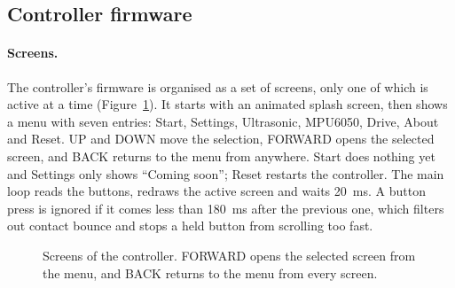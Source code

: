\subsection{Controller firmware}
\label{sec:con-fw}

\paragraph{Screens.} The controller's firmware is organised as a set of screens, only one
of which is active at a time (Figure~\ref{fig:screens}). It starts with an animated splash
screen, then shows a menu with seven entries: Start, Settings, Ultrasonic, MPU6050, Drive,
About and Reset. UP and DOWN move the selection, FORWARD opens the selected screen, and
BACK returns to the menu from anywhere. Start does nothing yet and Settings only shows
``Coming soon''; Reset restarts the controller. The main loop reads the buttons, redraws
the active screen and waits 20~ms. A button press is ignored if it comes less than
180~ms after the previous one, which filters out contact bounce and stops a held button
from scrolling too fast.

\begin{figure}[htbp]
  \centering
  \caption[Screens of the controller]{Screens of the controller. FORWARD opens the selected screen from the menu,
           and BACK returns to the menu from every screen.}
  \label{fig:screens}
\end{figure}

